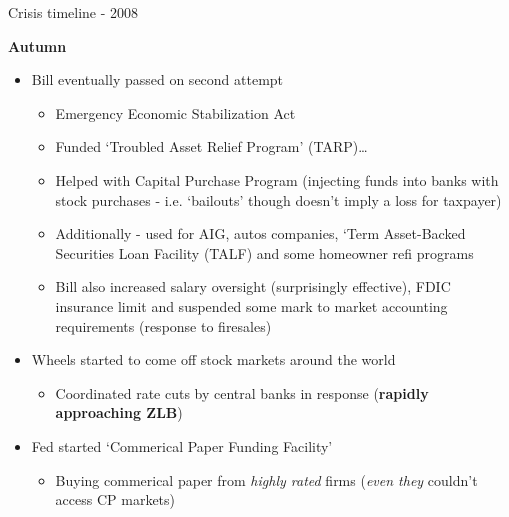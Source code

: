 

\begin{frame}{Crisis timeline - 2008}

\textbf{Autumn}
	\begin{itemize}
	\item[]	Bill eventually passed on second attempt
		\begin{itemize}
		\item	Emergency Economic Stabilization Act
		\item	Funded `Troubled Asset Relief Program' (TARP)\ldots
		\item	Helped with Capital Purchase Program (injecting funds into banks with stock purchases - i.e. `bailouts' though doesn't imply a loss for taxpayer)
		\item	Additionally - used for AIG, autos companies, `Term Asset-Backed Securities Loan Facility (TALF) and some homeowner refi programs
		\item	Bill also increased salary oversight (surprisingly effective), FDIC insurance limit and suspended some mark to market accounting requirements (response to firesales)
		\end{itemize}
	\vspace{2mm}
	\item[]	Wheels started to come off stock markets around the world
		\begin{itemize}
		\item	Coordinated rate cuts by central banks in response (\textbf{rapidly approaching ZLB})
		\end{itemize}
	\vspace{2mm}
	\item[]	Fed started `Commerical Paper Funding Facility'
		\begin{itemize}
		\item	Buying commerical paper from \textit{highly rated} firms (\textit{even they} couldn't access CP markets)
		\end{itemize}
	\end{itemize}
	
\end{frame}



